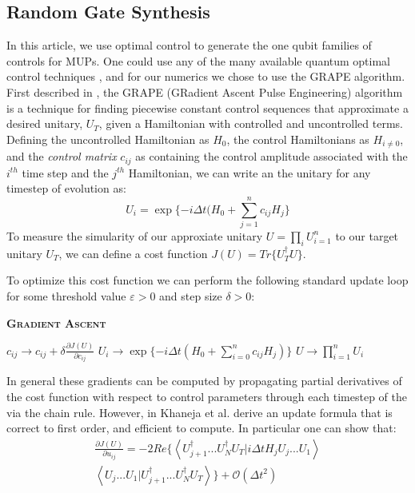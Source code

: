 \documentclass[aps,nofootinbib,pra,notitlepage,twocolumn]{revtex4-1}
\newcommand{\braket}[2]{\left\langle #1 | #2 \right\rangle}
\begin{document}
\subsection{Random Gate Synthesis}
\label{sec:random_gate_synthesis}
 In this article, we use optimal control to generate the one qubit families of controls for MUPs. One could use any of the many available quantum optimal control techniques \cite{Khaneja2005, Caneva2011, Machnes2018}, and for our numerics we chose to use the GRAPE algorithm. First described in \cite{Khaneja2005}, the GRAPE (GRadient Ascent Pulse Engineering) algorithm is a technique for finding piecewise constant control sequences that approximate a desired unitary, $U_T$, given a Hamiltonian with controlled and uncontrolled terms. Defining the uncontrolled Hamiltonian as $H_0$, the control Hamiltonians as $H_{i\neq 0}$, and the \textit{control matrix} $c_{ij}$ as containing the control amplitude associated with the $i^{th}$ time step and the $j^{th}$ Hamiltonian, we can write an the unitary for any timestep of evolution as:
\begin{equation}\label{eq:3}
  U_i = \exp\{-i\Delta t(H_0 + \sum_{j=1}^{n}c_{ij}H_{j}\}
\end{equation}
To measure the simularity of our approxiate unitary $U=\prod_iU_{i=1}^n$ to our target unitary $U_T$, we can define a cost function $J(U) = Tr\{U_T^{\dagger}U\}$.

To optimize this cost function we can perform the following standard update loop for some threshold value $\varepsilon > 0$ and step size $\delta > 0$:
\begin{algorithm}[H]
  \caption{\textsc{\textbf{Gradient Ascent}}}
  \begin{algorithmic}
    \State $c_{ij} \rightarrow c_{ij} + \delta\frac{\partial J(U)}{\partial c_{ij}}$
    \State $U_i \rightarrow \exp\{-i\Delta t(H_0 + \sum_{i=0}^{n}c_{ij}H_j)\}$
    \EndFor
    \State $U \rightarrow \prod_{i=1}^nU_i$
    \EndWhile
  \end{algorithmic}
\end{algorithm}

In general these gradients can be computed by propagating partial derivatives of the cost function with respect to control parameters through each timestep of the  via the chain rule. However, in \cite{Khaneja2005} Khaneja et al. derive an update formula that is correct to first order, and efficient to compute. In particular one can show that:
\begin{equation}\label{eq:update}
  \begin{split}
\frac{\partial J(U)}{\partial u_{ij}} = -2Re\{\braket{{U_{j+1}^{\dagger}...U_N^{\dagger} U_T}}{i\Delta tH_jU_j...U_1}\\
\braket{U_j...U_1}{U_{j+1}^{\dagger}...U_N^{\dagger} U_T}\} +  \mathcal{O}(\Delta t^2)
  \end{split}
\end{equation}
\end{document}

